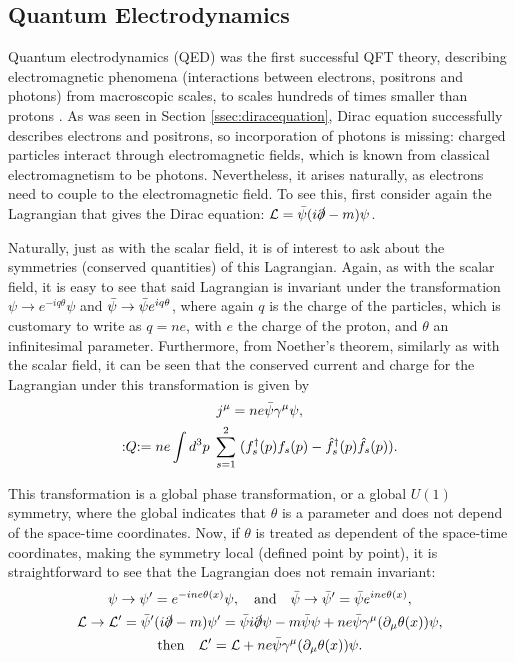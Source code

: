\subsection{Quantum Electrodynamics} \label{ssec:QED}

Quantum electrodynamics (QED) was the first successful QFT theory, describing electromagnetic phenomena (interactions between electrons, positrons and photons) from macroscopic scales, to scales hundreds of times smaller than protons \cite{Peskin}. As was seen in Section \ref{ssec:diracequation}, Dirac equation successfully describes electrons and positrons, so incorporation of photons is missing: charged particles interact through electromagnetic fields, which is known from classical electromagnetism to be photons. Nevertheless, it arises naturally, as electrons need to couple to the electromagnetic field. To see this, first consider again the Lagrangian  that gives the Dirac equation: $\mathcal{L} = \Bar{\psi}(i\slashed{\partial}-m)\psi$.

Naturally, just as with the scalar field, it is of interest to ask about the symmetries (conserved quantities) of this Lagrangian. Again, as with the scalar field, it is easy to see that said Lagrangian is invariant under the transformation $\psi \rightarrow e^{-iq\theta}\psi$ and $\Bar{\psi} \rightarrow \Bar{\psi}e^{iq\theta}$, where again $q$ is the charge of the particles, which is customary to write as $q=ne$, with $e$ the charge of the proton, and $\theta$ an infinitesimal parameter. Furthermore, from Noether's theorem, similarly as with the scalar field, it can be seen that the conserved current and charge for the Lagrangian under this transformation is given by
\begin{gather}
\label{spinorcurrent}
    j^{\mu} = ne\Bar{\psi}\gamma^{\mu}\psi, \\
    :\mathrel{Q}: = ne\int d^3p \; \sum_{s=1}^2 \; (f^{\dagger}_s(p)f_s(p) - \hat{f}^{\dagger}_s(p)\hat{f}_s(p)). \nonumber
\end{gather}

This transformation is a global phase transformation, or a global $U(1)$ symmetry, where the global indicates that $\theta$ is a parameter and does not depend of the space-time coordinates. Now, if $\theta$ is treated as dependent of the space-time coordinates, making the symmetry local (defined point by point), it is straightforward to see that the Lagrangian does not remain invariant:
\begin{gather}
    \psi \rightarrow \psi' = e^{-ine\theta(x)}\psi, \quad \textrm{and} \quad \Bar{\psi} \rightarrow \Bar{\psi}' = \Bar{\psi}e^{ine\theta(x)}, \nonumber \\
    \mathcal{L} \rightarrow \mathcal{L}' = \Bar{\psi}'(i\slashed{\partial} - m)\psi' = \Bar{\psi}i\slashed{\partial}\psi - m\Bar{\psi}\psi + ne\Bar{\psi}\gamma^{\mu}(\partial_{\mu}\theta(x))\psi, \nonumber \\
    \label{localtransf}
    \textrm{then} \quad \mathcal{L}' = \mathcal{L} + ne\Bar{\psi}\gamma^{\mu}(\partial_{\mu}\theta(x))\psi.
\end{gather}

